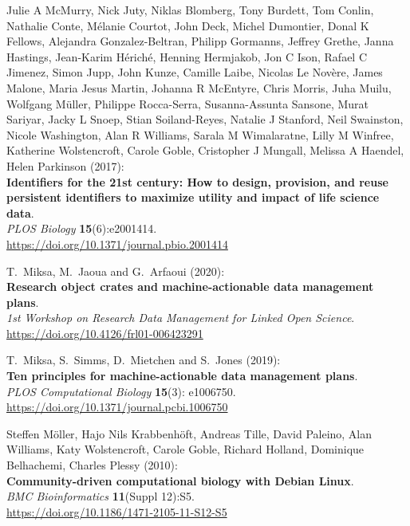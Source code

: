 \begin{thebibliography}{9}
Julie A McMurry, Nick Juty, Niklas Blomberg, Tony Burdett, Tom
Conlin, Nathalie Conte, Mélanie Courtot, John Deck, Michel Dumontier,
Donal K Fellows, Alejandra Gonzalez-Beltran, Philipp Gormanns, Jeffrey
Grethe, Janna Hastings, Jean-Karim Hériché, Henning Hermjakob, Jon C
Ison, Rafael C Jimenez, Simon Jupp, John Kunze, Camille Laibe, Nicolas
Le Novère, James Malone, Maria Jesus Martin, Johanna R McEntyre, Chris
Morris, Juha Muilu, Wolfgang Müller, Philippe Rocca-Serra,
Susanna-Assunta Sansone, Murat Sariyar, Jacky L Snoep, Stian
Soiland-Reyes, Natalie J Stanford, Neil Swainston, Nicole Washington,
Alan R Williams, Sarala M Wimalaratne, Lilly M Winfree, Katherine
Wolstencroft, Carole Goble, Cristopher J Mungall, Melissa A Haendel,
Helen Parkinson (2017):\\
\textbf{Identifiers for the 21st century: How to design, provision, and
reuse persistent identifiers to maximize utility and impact of life
science data}.\\
\emph{PLOS Biology} \textbf{15}(6):e2001414.\\
\url{https://doi.org/10.1371/journal.pbio.2001414}

T.~Miksa, M.~Jaoua and G.~Arfaoui (2020):\\
\textbf{Research object crates and machine-actionable data management
plans}.\\
\emph{1st Workshop on Research Data Management for Linked Open
Science}.\\
\url{https://doi.org/10.4126/frl01-006423291}

T.~Miksa, S.~Simms, D.~Mietchen and S.~Jones (2019):\\
\textbf{Ten principles for machine-actionable data management plans}.\\
\emph{PLOS Computational Biology} \textbf{15}(3): e1006750.\\
\url{https://doi.org/10.1371/journal.pcbi.1006750}

Steffen Möller, Hajo Nils Krabbenhöft, Andreas Tille, David
Paleino, Alan Williams, Katy Wolstencroft, Carole Goble, Richard
Holland, Dominique Belhachemi, Charles Plessy (2010):\\
\textbf{Community-driven computational biology with Debian Linux}.\\
\emph{BMC Bioinformatics} \textbf{11}(Suppl 12):S5.\\
\url{https://doi.org/10.1186/1471-2105-11-S12-S5}


\end{thebibliography}
